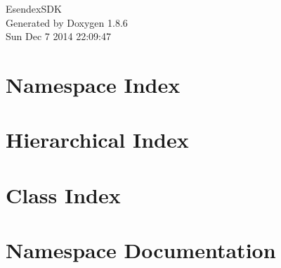 \documentclass[twoside]{book}
\newcommand{\clearemptydoublepage}{%
  \newpage{\pagestyle{empty}\cleardoublepage}%
}
\begin{document}
\begin{titlepage}
\vspace*{7cm}
\begin{center}%
{\Large Esendex\-S\-D\-K }\\
\vspace*{1cm}
{\large Generated by Doxygen 1.8.6}\\
\vspace*{0.5cm}
{\small Sun Dec 7 2014 22:09:47}\\
\end{center}
\end{titlepage}
\clearemptydoublepage
\tableofcontents
\clearemptydoublepage
{}

\chapter{Namespace Index}

\chapter{Hierarchical Index}

\chapter{Class Index}

\chapter{Namespace Documentation}

\end{document}
